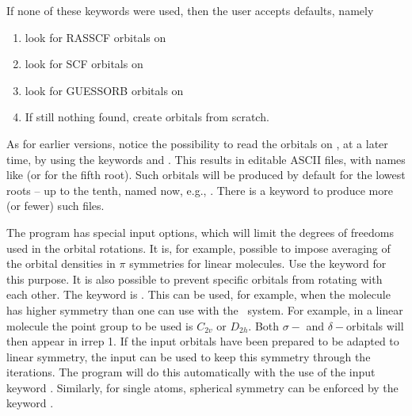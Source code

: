 If none of these keywords were used, then the user accepts defaults, namely
\begin{enumerate}
\item look for RASSCF orbitals on 
\item look for SCF orbitals on 
\item look for GUESSORB orbitals on 
\item If still nothing found, create orbitals from scratch.
\end{enumerate}

As for earlier versions, notice the possibility
to read the orbitals on , at a later time, by using
the keywords  and . This results in
editable ASCII files, with names like  (or 
for the fifth root). Such orbitals will be produced by default for the lowest
roots -- up to the tenth, named now, e.g., . There is a keyword 
to produce more (or fewer) such files.

The  program has special input options, which will limit the degrees of
freedoms used in the orbital rotations. It is, for example, possible to impose
averaging of the orbital densities in $\pi$ symmetries for linear molecules.
Use the keyword  for this purpose. It is also
possible to prevent specific orbitals from rotating with each other. The
keyword is . This can be used, for example, when the molecule
has higher symmetry than one can use with the \molcas\ system. For example, in
a linear molecule the point group to be used is $C_{2v}$ or $D_{2h}$. Both
$\sigma-$ and $\delta-$orbitals will then appear in irrep 1. If the input
orbitals have been prepared to be adapted to linear symmetry, the
 input can be used to keep this symmetry through the iterations.
The program will do this automatically with the use of the
input keyword . Similarly, for single atoms, spherical
symmetry can be enforced by  the keyword .

